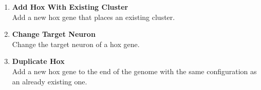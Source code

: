 \begin{enumerate}
    \item \textbf{Add Hox With Existing Cluster} \\    
    Add a new hox gene that places an existing cluster.
    
    \item \textbf{Change Target Neuron} \\    
    Change the target neuron of a hox gene.
    
    \item \textbf{Duplicate Hox} \\    
    Add a new hox gene to the end of the genome with the same configuration as an already existing one.
    
\end{enumerate}
